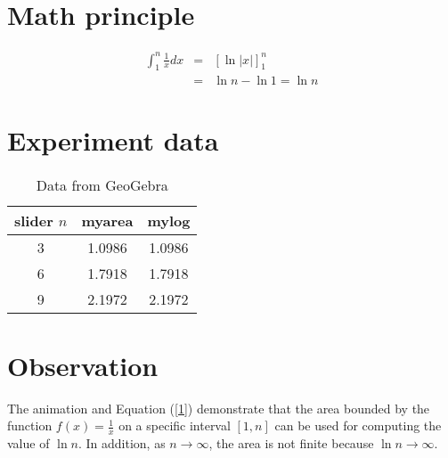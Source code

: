 \documentclass{article}
\newcommand{\ds}{\displaystyle}
\begin{document}
\section{Math principle}
\begin{eqnarray}
\ds\int_{1}^{n}\frac{1}{x}dx&=&\left[\ln |x|\right]^{n}_{1}\nonumber\\
&=&\ln n-\ln 1=\ln n\label{1}
\end{eqnarray}
\section{Experiment data}
\begin{table}[h]
\centering
\begin{tabular}{|c||c|c|}
\hline
slider $n$& myarea&mylog\\
\hline
3&1.0986&1.0986\\
\hline
6&1.7918&1.7918\\
\hline
9&2.1972&2.1972\\
\hline
\end{tabular}
\caption{Data from GeoGebra}
\end{table}
\section{Observation}
The animation and Equation (\ref{1}) demonstrate that the area bounded by the function $f(x)=\frac{1}{x}$ on a specific interval $[1, n]$ can be used for computing the value of $\ln n$. In
addition, as $n \rightarrow \infty$, the area is not finite because $\ln n \rightarrow \infty$.
\end{document}
